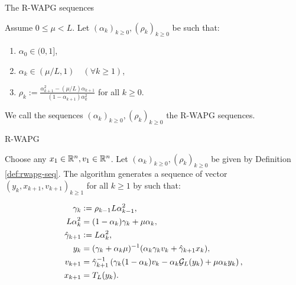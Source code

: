 \documentclass[11pt]{beamer}
\theoremstyle{definition}
\begin{document}
    \begin{frame}{The R-WAPG sequences}
        \begin{definition}\label{def:rwapg-seq}
            Assume $0 \le \mu < L$. 
            Let $(\alpha_k)_{k \ge 0}, (\rho_k)_{k \ge 0}$ be such that: 
            \begin{enumerate}
                \item $\alpha_0 \in (0, 1]$, 
                \item $\alpha_k \in (\mu/L, 1) \quad (\forall k \ge 1)$, 
                \item $\rho_k := \frac{\alpha_{k + 1}^2 - (\mu/L) \alpha_{k + 1}}{(1 - \alpha_{k + 1}) \alpha_k^2}$ for all $k \ge 0$. 
            \end{enumerate}  
            We call the sequences $(\alpha_k)_{k \ge 0}, (\rho_k)_{k \ge0}$ the R-WAPG sequences. 
        \end{definition}
    \end{frame}
    \begin{frame}{R-WAPG}
        \begin{definition}[R-WAPG]\label{def:wapg}
            Choose any $x_1 \in \mathbb R^n, v_1 \in \mathbb R^n$.
            Let $(\alpha_k)_{k \ge0}, (\rho_k)_{k \ge 0}$ be given by Definition \ref{def:rwapg-seq}.
            The algorithm generates a sequence of vector $(y_k, x_{k + 1}, v_{k + 1})_{k \ge 1}$ for all $k\ge 1$ by such that:
            \begin{tcolorbox}\vspace{-1em}
                \begin{align*}
                    \gamma_k &\vcentcolon= \rho_{k -1}L\alpha_{k - 1}^2,
                    \\
                    L\alpha_k^2 &= (1 - \alpha_k)\gamma_k + \mu \alpha_k, 
                    \\
                    \hat \gamma_{k + 1} & \vcentcolon= L\alpha_k^2,
                    \\
                    y_k &=
                    (\gamma_k + \alpha_k \mu)^{-1}(\alpha_k \gamma_k v_k + \hat\gamma_{k + 1} x_k),
                    \\
                    v_{k + 1} &=
                    \hat\gamma^{-1}_{k + 1}
                    \left(\gamma_k(1 - \alpha_k) v_k - \alpha_k \mathcal G_L (y_k) + \mu \alpha_k y_k\right),
                    \\
                    x_{k + 1} &= T_L (y_k).
                \end{align*}
            \end{tcolorbox}
        \end{definition}
    \end{frame}
\end{document}
